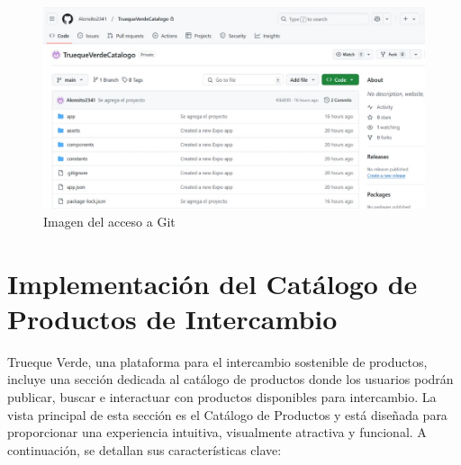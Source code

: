 \documentclass[11pt, a4paper, oneside]{book}
\begin{document}
\begin{figure}[H]
    \centering
    \includegraphics[width=0.80
    \linewidth]{Pictures/git.jpg}
        \caption{Imagen del acceso a Git}

\end{figure}

\section{Implementación del Catálogo de Productos de Intercambio}
Trueque Verde, una plataforma para el intercambio sostenible de productos, incluye una sección dedicada al catálogo de productos donde los usuarios podrán publicar, buscar e interactuar con productos disponibles para intercambio.
La vista principal de esta sección es el Catálogo de Productos y está diseñada para proporcionar una experiencia intuitiva, visualmente atractiva y funcional. A continuación, se detallan sus características clave:
\end{document}
